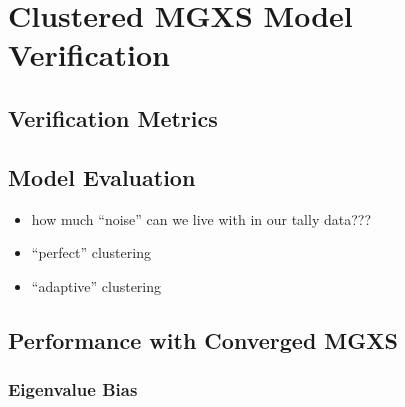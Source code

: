 \chapter{Clustered MGXS Model Verification}
\label{chap:results}


\section{Verification Metrics}
\label{sec:chap7-verify}


\section{Model Evaluation}
\label{sec:chap7-evaluate}

\begin{itemize}[noitemsep]
  \item how much ``noise'' can we live with in our tally data???
  \item ``perfect'' clustering
  \item ``adaptive'' clustering
\end{itemize}


\section{Performance with Converged MGXS}
\label{sec:chap11-improvements}

\subsection{Eigenvalue Bias}
\label{subsec:chap11-eigenvalue-bias}


